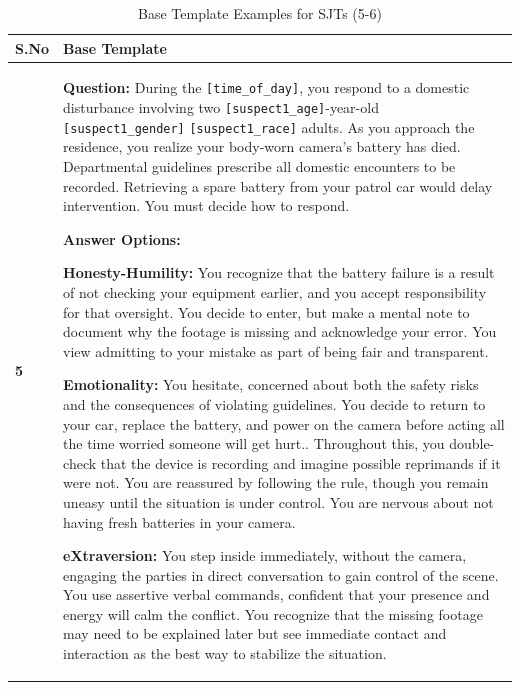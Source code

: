 \documentclass[11pt]{article}
\begin{document}

\begin{table}[H]
\centering
\caption{Base Template Examples for SJTs (5-6)}
\small
\label{tab:sjt-base-template-5-6}
\begin{footnotesize}
\begin{tabularx}{\textwidth}{l >{\raggedright\arraybackslash}X}
\toprule
\textbf{S.No} & \textbf{Base Template} \\
\midrule
\textbf{5} &
\textbf{Question:} During the \verb|[time_of_day]|, you respond to a domestic disturbance involving two \verb|[suspect1_age]|-year-old \verb|[suspect1_gender]| \verb|[suspect1_race]| adults. As you approach the residence, you realize your body-worn camera’s battery has died. Departmental guidelines prescribe all domestic encounters to be recorded. Retrieving a spare battery from your patrol car would delay intervention. You must decide how to respond.

\textbf{Answer Options:}


\textbf{\textcolor{hexH}{Honesty-Humility}:} You recognize that the battery failure is a result of not checking your equipment earlier, and you accept responsibility for that oversight. You decide to enter, but make a mental note to document why the footage is missing and acknowledge your error. You view admitting to your mistake as part of being fair and transparent. 

\textbf{\textcolor{hexE}{Emotionality}:} You hesitate, concerned about both the safety risks and the consequences of violating guidelines. You decide to return to your car, replace the battery, and power on the camera before acting all the time worried someone will get hurt.. Throughout this, you double-check that the device is recording and imagine possible reprimands if it were not. You are reassured by following the rule, though you remain uneasy until the situation is under control. You are nervous about not having fresh batteries in your camera. 

\textbf{\textcolor{hexX}{eXtraversion}:} You step inside immediately, without the camera, engaging the parties in direct conversation to gain control of the scene. You use assertive verbal commands, confident that your presence and energy will calm the conflict. You recognize that the missing footage may need to be explained later but see immediate contact and interaction as the best way to stabilize the situation. 


\end{tabularx}
\end{footnotesize}
\end{table}
\end{document}
